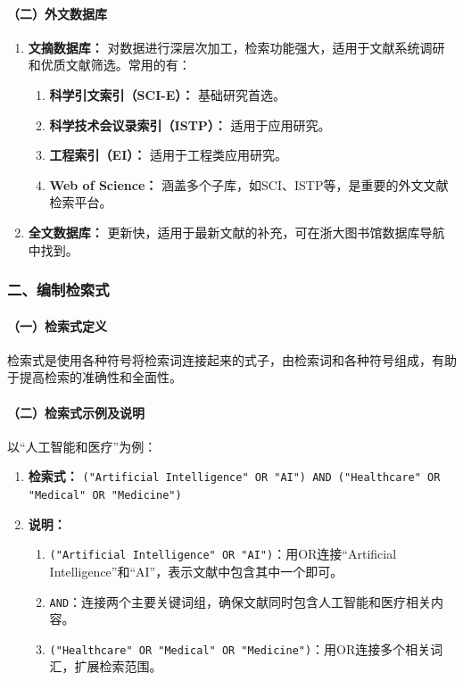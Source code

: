 \paragraph{（二）外文数据库}

\begin{enumerate}
  \item \textbf{文摘数据库：} 对数据进行深层次加工，检索功能强大，适用于文献系统调研和优质文献筛选。常用的有：
  \begin{enumerate}
    \item \textbf{科学引文索引（SCI-E）：} 基础研究首选。
    \item \textbf{科学技术会议录索引（ISTP）：} 适用于应用研究。
    \item \textbf{工程索引（EI）：} 适用于工程类应用研究。
    \item \textbf{Web of Science：} 涵盖多个子库，如SCI、ISTP等，是重要的外文文献检索平台。
  \end{enumerate}
  \item \textbf{全文数据库：} 更新快，适用于最新文献的补充，可在浙大图书馆数据库导航中找到。
\end{enumerate}

\subsubsection*{二、编制检索式}

\paragraph{（一）检索式定义}

检索式是使用各种符号将检索词连接起来的式子，由检索词和各种符号组成，有助于提高检索的准确性和全面性。

\paragraph{（二）检索式示例及说明}

以“人工智能和医疗”为例：

\begin{enumerate}
  \item \textbf{检索式：} \texttt{("Artificial Intelligence" OR "AI") AND ("Healthcare" OR "Medical" OR "Medicine")}
  \item \textbf{说明：}
  \begin{enumerate}
    \item \texttt{("Artificial Intelligence" OR "AI")}：用OR连接“Artificial Intelligence”和“AI”，表示文献中包含其中一个即可。
    \item \texttt{AND}：连接两个主要关键词组，确保文献同时包含人工智能和医疗相关内容。
    \item \texttt{("Healthcare" OR "Medical" OR "Medicine")}：用OR连接多个相关词汇，扩展检索范围。
  \end{enumerate}
\end{enumerate}

